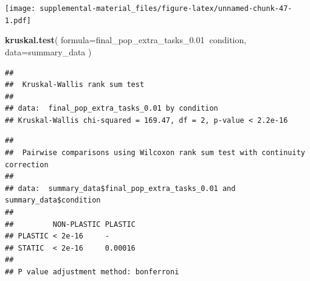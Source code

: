 \documentclass[]{book}
\newenvironment{Shaded}{\begin{snugshade}}{\end{snugshade}}
\newcommand{\DataTypeTok}[1]{\textcolor[rgb]{0.13,0.29,0.53}{#1}}
\newcommand{\FloatTok}[1]{\textcolor[rgb]{0.00,0.00,0.81}{#1}}
\newcommand{\KeywordTok}[1]{\textcolor[rgb]{0.13,0.29,0.53}{\textbf{#1}}}
\newcommand{\NormalTok}[1]{#1}
\newcommand{\OperatorTok}[1]{\textcolor[rgb]{0.81,0.36,0.00}{\textbf{#1}}}
\newcommand{\OtherTok}[1]{\textcolor[rgb]{0.56,0.35,0.01}{#1}}
\newcommand{\StringTok}[1]{\textcolor[rgb]{0.31,0.60,0.02}{#1}}
\begin{document}
\texttt{[image: supplemental-material\_files/figure-latex/unnamed-chunk-47-1.pdf]}

\begin{Shaded}
\begin{Highlighting}[]
\KeywordTok{kruskal.test}\NormalTok{(}
  \DataTypeTok{formula=}\NormalTok{final_pop_extra_tasks_}\FloatTok{0.01}\OperatorTok{~}\NormalTok{condition,}
  \DataTypeTok{data=}\NormalTok{summary_data}
\NormalTok{)}
\end{Highlighting}
\end{Shaded}

\begin{verbatim}
## 
##  Kruskal-Wallis rank sum test
## 
## data:  final_pop_extra_tasks_0.01 by condition
## Kruskal-Wallis chi-squared = 169.47, df = 2, p-value < 2.2e-16
\end{verbatim}

\begin{Shaded}
\end{Shaded}

\begin{verbatim}
## 
##  Pairwise comparisons using Wilcoxon rank sum test with continuity correction 
## 
## data:  summary_data$final_pop_extra_tasks_0.01 and summary_data$condition 
## 
##         NON-PLASTIC PLASTIC
## PLASTIC < 2e-16     -      
## STATIC  < 2e-16     0.00016
## 
## P value adjustment method: bonferroni
\end{verbatim}
\end{document}
